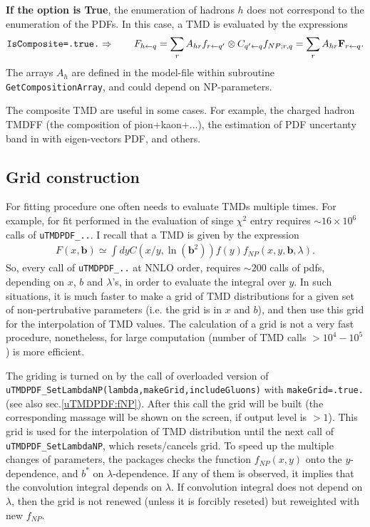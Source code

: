 \documentclass[prd,nofootinbib,eqsecnum,final]{revtex4}
\newcommand{\nn}{\nonumber}
\newcommand{\ot}{\leftarrow}
\renewcommand{\(}{\left(}
\renewcommand{\)}{\right)}
\renewcommand{\[}{\left[}
\renewcommand{\]}{\right]}
\renewcommand{\vec}[1]{\bm{#1}}
\begin{document}
\textbf{If the option is True}, the enumeration of hadrons $h$ does not correspond to the enumeration of the PDFs. In this case, a TMD is evaluated by the expressions
\begin{eqnarray}\nn
\text{\texttt{IsComposite=.true.}}\Rightarrow\qquad F_{h\ot q}=\sum_{r}A_{h r} f_{r\ot q'}\otimes C_{q'\ot q}f_{NP;r,q}=\sum_r A_{hr}\mathbf{F}_{r\ot q}.
\end{eqnarray}
The arrays $A_h$ are defined in the model-file within subroutine \texttt{GetCompositionArray}, and could depend on NP-parameters.

The composite TMD are useful in some cases. For example, the charged hadron TMDFF (the composition of pion+kaon+...), the estimation of PDF uncertanty band in with eigen-vectors PDF, and others.

\subsection{Grid construction}
\label{uTMDPDF:grid}

For fitting procedure one often needs to evaluate TMDs multiple times. For example, for fit performed in \cite{Scimemi:2017etj} the evaluation of singe $\chi^2$ entry requires $\sim 16\times 10^6$ calls of \texttt{uTMDPDF{\_}..}. I recall that a TMD is given by the expression
\begin{eqnarray}
F(x,\vec b)\simeq\int dy C(x/y,\ln(\vec b^2)) f(y)f_{NP}(x,y,\vec b,\lambda).
\end{eqnarray}
So, every call of \texttt{uTMDPDF{\_}..} at NNLO order, requires $\sim 200$ calls of pdfs, depending on $x$, $b$ and $\lambda$'s, in order to evaluate the integral over $y$. In such situations, it is much faster to make a grid of TMD distributions for a given set of non-pertrubative parameters (i.e. the grid is in $x$ and $b$), and then use this grid for the interpolation of TMD values. The calculation of a grid is not a very fast procedure, nonetheless, for large computation (number of TMD calls $>10^4-10^5$) is more efficient.

The griding is turned on by the call of overloaded version of \texttt{uTMDPDF{\_}SetLambdaNP(lambda,makeGrid,includeGluons)}  with \texttt{makeGrid=.true.} (see also sec.\ref{uTMDPDF:fNP}). After this call the grid will be built (the corresponding massage will be shown on the screen, if output level is $>1$). This grid is used for the interpolation of TMD distribution until the next call of \texttt{uTMDPDF{\_}SetLambdaNP}, which resets/cancels grid. To speed up the multiple changes of parameters, the packages checks the function $f_{NP}(x,y)$ onto the $y$-dependence, and $b^*$ on $\lambda$-dependence. If any of them is observed, it implies that the convolution integral depends on $\lambda$. If convolution integral does not depend on $\lambda$, then the grid is not renewed (unless it is forcibly reseted) but reweighted with new $f_{NP}$.
\end{document}
